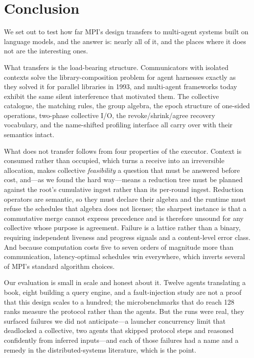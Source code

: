 \section{Conclusion}

We set out to test how far MPI's design transfers to multi-agent systems
built on language models, and the answer is: nearly all of it, and the
places where it does not are the interesting ones.

What transfers is the load-bearing structure. Communicators with isolated
contexts solve the library-composition problem for agent harnesses exactly
as they solved it for parallel libraries in 1993, and multi-agent frameworks
today exhibit the same silent interference that motivated them. The
collective catalogue, the matching rules, the group algebra, the epoch
structure of one-sided operations, two-phase collective I/O, the
revoke/shrink/agree recovery vocabulary, and the name-shifted profiling
interface all carry over with their semantics intact.

What does not transfer follows from four properties of the executor.
Context is consumed rather than occupied, which turns a receive into an
irreversible allocation, makes collective \emph{feasibility} a question that
must be answered before cost, and---as we found the hard way---means a
reduction tree must be planned against the root's cumulative ingest rather
than its per-round ingest. Reduction operators are semantic, so they must
declare their algebra and the runtime must refuse the schedules that algebra
does not license; the sharpest instance is that a commutative merge cannot
express precedence and is therefore unsound for any collective whose purpose
is agreement. Failure is a lattice rather than a binary, requiring
independent liveness and progress signals and a content-level error class.
And because computation costs five to seven orders of magnitude more than
communication, latency-optimal schedules win everywhere, which inverts
several of MPI's standard algorithm choices.

Our evaluation is small in scale and honest about it. Twelve agents
translating a book, eight building a query engine, and a fault-injection
study are not a proof that this design scales to a hundred; the
microbenchmarks that do reach 128 ranks measure the protocol rather than the
agents. But the runs were real, they surfaced failures we did not
anticipate---a launcher concurrency limit that deadlocked a collective, two
agents that skipped protocol steps and reasoned confidently from inferred
inputs---and each of those failures had a name and a remedy in the
distributed-systems literature, which is the point.

